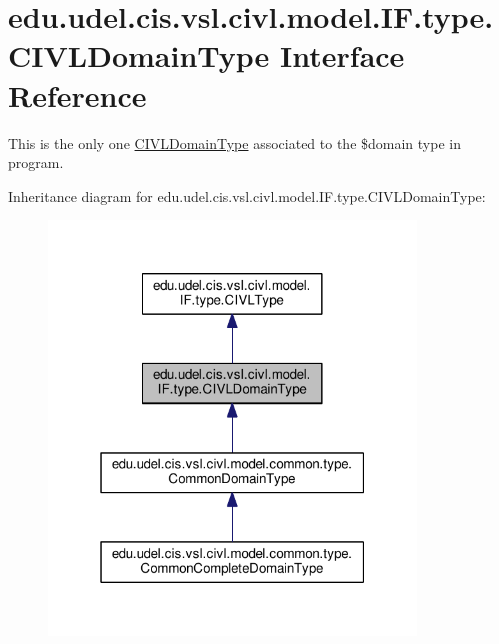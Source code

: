 \hypertarget{interfaceedu_1_1udel_1_1cis_1_1vsl_1_1civl_1_1model_1_1IF_1_1type_1_1CIVLDomainType}{}\section{edu.\+udel.\+cis.\+vsl.\+civl.\+model.\+I\+F.\+type.\+C\+I\+V\+L\+Domain\+Type Interface Reference}
\label{interfaceedu_1_1udel_1_1cis_1_1vsl_1_1civl_1_1model_1_1IF_1_1type_1_1CIVLDomainType}


This is the only one \hyperlink{interfaceedu_1_1udel_1_1cis_1_1vsl_1_1civl_1_1model_1_1IF_1_1type_1_1CIVLDomainType}{C\+I\+V\+L\+Domain\+Type} associated to the \$domain type in program.  




Inheritance diagram for edu.\+udel.\+cis.\+vsl.\+civl.\+model.\+I\+F.\+type.\+C\+I\+V\+L\+Domain\+Type\+:
\nopagebreak
\begin{figure}[H]
\begin{center}
\leavevmode
\includegraphics[width=277pt]{interfaceedu_1_1udel_1_1cis_1_1vsl_1_1civl_1_1model_1_1IF_1_1type_1_1CIVLDomainType__inherit__graph}
\end{center}
\end{figure}


